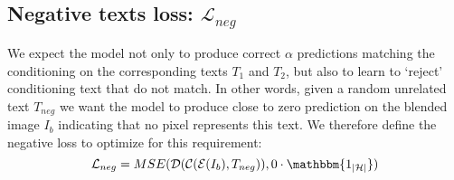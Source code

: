 \documentclass[10pt,twocolumn,letterpaper]{article}
\newcommand\secvspace{\vspace{-0.0cm}}
\begin{document}
\secvspace
\subsection{Negative texts loss: $\mathcal{L}_{neg}$}\label{sec:neg}
\secvspace
We expect the model not only to produce correct $\alpha$ predictions matching the conditioning on the corresponding texts $T_1$ and $T_2$, but also to learn to `reject' conditioning text that do not match. In other words, given a random unrelated text $T_{neg}$ we want the model to produce close to zero prediction on the blended image $I_b$ indicating that no pixel represents this text. 
We therefore define the negative loss to optimize for this requirement:
\begin{equation}
    \mathcal{L}_{neg} = MSE(\mathcal{D}(\mathcal{C}(\mathcal{E}(I_b),T_{neg})),0 \cdot \mathbbm{1_{|\mathcal{H}|}})
\end{equation}

\secvspace
\end{document}
